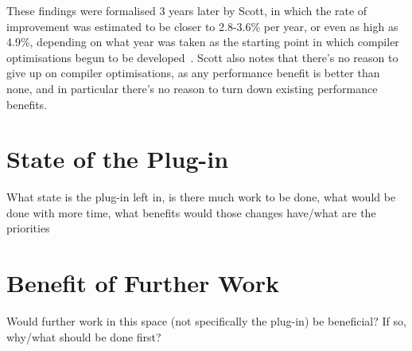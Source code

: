 These findings were formalised 3 years later by Scott, in which the rate of improvement was estimated to be closer to 2.8-3.6\% per year, or even as high as 4.9\%, depending on what year was taken as the starting point in which compiler optimisations begun to be developed~\cite{proebstingformal}. Scott also notes that there's no reason to give up on compiler optimisations, as any performance benefit is better than none, and in particular there's no reason to turn down existing performance benefits.

\section{State of the Plug-in}

What state is the plug-in left in, is there much work to be done, what would be done with more time, what benefits would those changes have/what are the priorities

\section{Benefit of Further Work}

Would further work in this space (not specifically the plug-in) be beneficial? If so, why/what should be done first?
